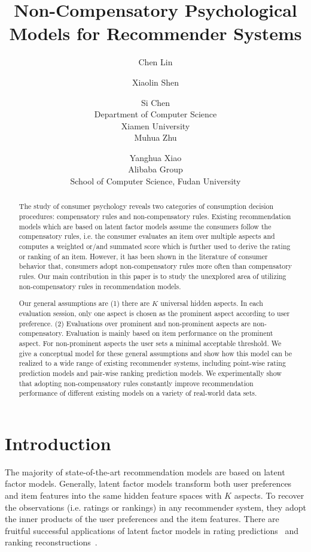\documentclass[letterpaper]{article} %
\begin{document}
\title{Non-Compensatory Psychological Models for Recommender Systems}
\author{Chen Lin \and Xiaolin Shen \and Si Chen\\
Department of Computer Science\\
Xiamen University\\
\And
Muhua Zhu \and Yanghua Xiao \\
Alibaba Group \\
School of Computer Science, Fudan University 
}
\maketitle
\begin{abstract}
The study of consumer psychology reveals two categories of consumption decision procedures: compensatory rules and non-compensatory rules. Existing recommendation models which are based on latent factor models assume the consumers follow the compensatory rules, i.e. the consumer evaluates an item over multiple aspects and computes a weighted or/and summated score which is further used to derive the rating or ranking of an item. However, it has been shown in the literature of consumer behavior that, consumers adopt non-compensatory rules more often than compensatory rules. Our main contribution in this paper is to study the unexplored area of utilizing non-compensatory rules in recommendation models. 

Our general assumptions are (1) there are $K$ universal hidden aspects. In each evaluation session, only one aspect is chosen as the prominent aspect according to user preference. (2) Evaluations over prominent and non-prominent aspects are non-compensatory. Evaluation is mainly based on item performance on the prominent aspect. For non-prominent aspects the user sets a minimal acceptable threshold. We give a conceptual model for these general assumptions and show how this model can be realized to a wide range of existing recommender systems, including  point-wise rating prediction models and pair-wise ranking prediction models.  We experimentally show that adopting non-compensatory rules constantly improve recommendation performance of different existing models on a variety of real-world data sets.
\end{abstract}


\section{Introduction}\label{sec:introduction}
The majority of state-of-the-art recommendation models are based on latent factor models. Generally, latent factor models transform both user preferences and item features into the same hidden feature spaces with $K$ aspects. To recover the observations (i.e. ratings or rankings) in any recommender system, they adopt the inner products of the user preferences and the item features. There are fruitful successful applications of latent factor models in  rating predictions~\cite{Koren2009Matrix,Koren2010Factor,Lee2014Local} and ranking reconstructions~\cite{Rendle2009BPR,Steck2015Gaussian,Zhao2018Factored,Shi2010List}.   
\end{document}
